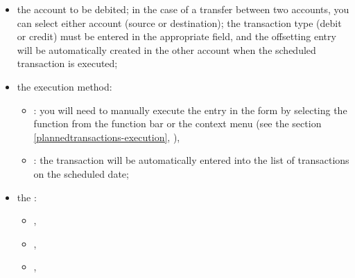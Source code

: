 \begin{itemize}
	\item the account to be debited; in the case of a transfer between two accounts, you can select either account (source or destination); the transaction type (debit or credit) must be entered in the appropriate field, and the offsetting entry will be automatically created in the other account when the scheduled transaction is executed;
	\item the execution method:
	\begin{itemize}
		\item {}: you will need to manually execute the entry in the form by selecting the  function from the function bar or the context menu (see the section \vref{plannedtransactions-execution}, ),
		\item {}: the transaction will be automatically entered into the list of transactions on the scheduled date;
	\end{itemize}
	\item the :
	\begin{itemize}
		\item {},
		\item {},
		\item {},

\end{itemize}
\end{itemize}
